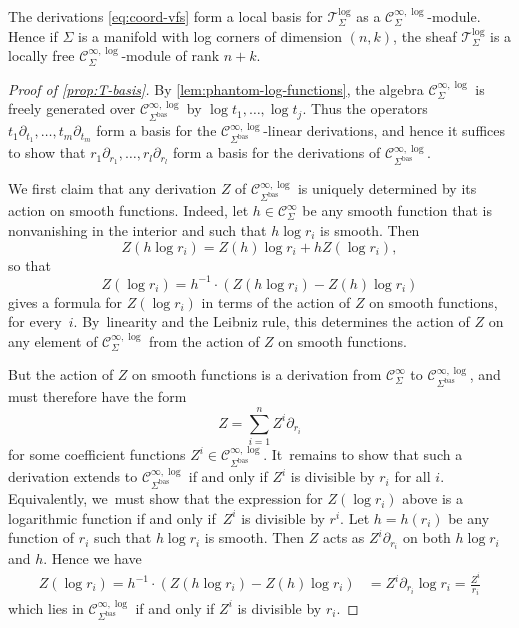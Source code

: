 \documentclass[10pt]{amsart}
\theoremstyle{definition}
\theoremstyle{remark}
\newcommand{\Cinf}[1]{\mathscr{C}^{\infty}_{#1}}
\newcommand{\Cinflog}[1]{\mathscr{C}^{\infty,\log}_{#1}}
\newcommand{\VFlog}[1]{\mathcal{T}^{\log}_{#1}}
\newcommand{\cvf}[1]{\partial_{#1}}
\newcommand{\logcvf}[1]{#1\partial_{#1}}
\newcommand{\Sig}{\Sigma}
\newcommand{\bas}[1]{{#1}^{\mathrm{bas}}}
\newcommand{\Sigbas}{\bas{\Sig}}
\begin{document}
\begin{proposition}\label{prop:T-basis}
The derivations \eqref{eq:coord-vfs} form a local basis for $\VFlog{\Sig}$ as a $\Cinflog{\Sig}$-module. Hence if $\Sig$ is a manifold with log corners of dimension $(n,k)$, the sheaf $\VFlog{\Sig}$ is a locally free $\Cinflog{\Sig}$-module of rank $n+k$.
\end{proposition}

\begin{proof}[Proof of \autoref{prop:T-basis}]
By \autoref{lem:phantom-log-functions}, the algebra $\Cinflog{\Sig}$ is freely generated over $\Cinflog{\Sigbas}$ by $\log t_1,\ldots,\log t_j$. Thus the operators $\logcvf{t_1},\ldots,\logcvf{t_m}$ form a basis for the $\Cinflog{\Sigbas}$-linear derivations, and hence it suffices to show that $\logcvf{r_1},\ldots,\logcvf{r_l}$ form a basis for the derivations of $\Cinflog{\Sigbas}$.

We first claim that any derivation $Z$ of $\Cinflog{\Sigbas}$ is uniquely determined by its action on smooth functions. Indeed, let $h \in \Cinf{\Sig}$ be any smooth function that is nonvanishing in the interior and such that $h \log r_i$ is smooth. Then
\[
Z(h \log r_i) = Z(h) \log r_i + h Z(\log r_i),
\]
so that
\[
Z(\log r_i) = h^{-1}\cdot (Z(h \log r_i) - Z(h)\log r_i)
\]
gives a formula for $Z(\log r_i)$ in terms of the action of $Z$ on smooth functions, for every~$i$. By~linearity and the Leibniz rule, this determines the action of $Z$ on any element of $\Cinflog{\Sig}$ from the action of $Z$ on smooth functions.

But the action of $Z$ on smooth functions is a derivation from $\Cinf{\Sig}$ to $\Cinflog{\Sigbas}$, and must therefore have the form
\[
Z = \sum_{i=1}^n Z^i \cvf{r_i}
\]
for some coefficient functions $Z^i\in \Cinflog{\Sigbas}$. It~remains to show that such a derivation extends to $\Cinflog{\Sigbas}$ if and only if $Z^i$ is divisible by $r_i$ for all $i$. Equivalently, we~must show that the expression for $Z(\log r_i)$ above is a logarithmic function if and only if~$Z^i$ is divisible by $r^i$. Let $h = h(r_i)$ be any function of $r_i$ such that $h\log r_i$ is smooth. Then $Z$ acts as $Z^i\cvf{r_i}$ on both $h \log r_i$ and $h$. Hence we have
\begin{align*}
Z(\log r_i) = h^{-1}\cdot (Z(h \log r_i) - Z(h)\log r_i) &= Z^i\cvf{r_i}\log r_i = \frac{Z^i}{r_i}
\end{align*}
which lies in $\Cinflog{\Sigbas}$ if and only if $Z^i$ is divisible by $r_i$.
\end{proof}
\end{document}

